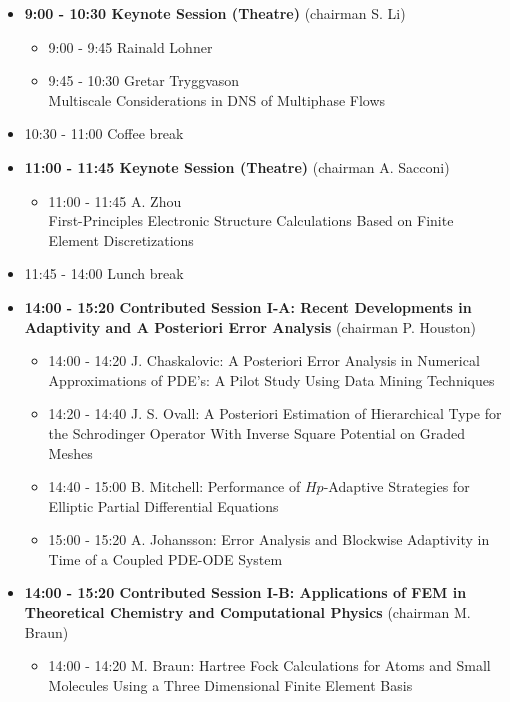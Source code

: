 \documentclass[10pt, A4]{article}%
\begin{document}
\begin{itemize}    
  \item {\bf 9:00 - 10:30 Keynote Session (Theatre)} (chairman S. Li) 
  \begin{itemize}
    \item 9:00 - 9:45 {Rainald Lohner}
    \item 9:45 - 10:30 {Gretar Tryggvason}\\{Multiscale Considerations in DNS of Multiphase Flows}
  \end{itemize}
  \item 10:30 - 11:00 Coffee break
  \item {\bf 11:00 - 11:45 Keynote Session (Theatre)} (chairman A. Sacconi) 
  \begin{itemize}
    \item 11:00 - 11:45 {A. Zhou}\\{First-Principles Electronic Structure Calculations Based on Finite Element Discretizations}
  \end{itemize}
  \item 11:45 - 14:00 Lunch break      
  \item {\bf 14:00 - 15:20 Contributed Session I-A: Recent Developments in Adaptivity and A Posteriori Error Analysis} (chairman P. Houston) 
  \begin{itemize}
    \item 14:00 - 14:20 {J. Chaskalovic}: {A Posteriori Error Analysis in Numerical Approximations of PDE's: A Pilot Study Using Data Mining Techniques} %
    \item 14:20 - 14:40 {J. S. Ovall}: {A Posteriori Estimation of Hierarchical Type for the  Schrodinger Operator With Inverse Square Potential on Graded Meshes}
    \item 14:40 - 15:00 {B. Mitchell}: {Performance of $Hp$-Adaptive Strategies for Elliptic Partial Differential Equations}
    \item 15:00 - 15:20 {A. Johansson}: {Error Analysis and Blockwise Adaptivity in Time of a Coupled PDE-ODE System} 
  \end{itemize}
  \item {\bf 14:00 - 15:20 Contributed Session I-B: Applications of FEM in Theoretical Chemistry and Computational Physics} (chairman M. Braun) 
  \begin{itemize}
    \item 14:00 - 14:20 {M. Braun}: {Hartree Fock Calculations for Atoms and Small Molecules Using  a Three Dimensional Finite Element Basis}

\end{itemize}
\end{itemize}
\end{document}
